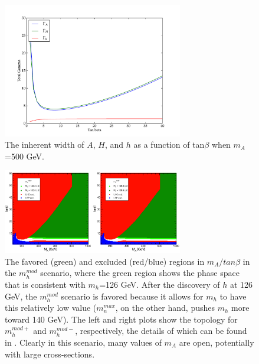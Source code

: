 \begin{figure}
	\centering
	\includegraphics[width=0.7\textwidth]{Theory/figures/TB_gamma.pdf}
	\caption{The inherent width of $A$, $H$, and $h$ as a function of tan$\beta$ when $m_A$=500 GeV. \label{fig:TB_width}}
\end{figure}





\begin{figure}
	\centering
	\includegraphics[width=0.7\textwidth]{Theory/figures/mh_mod.pdf}
	\caption{The favored (green) and excluded (red/blue) regions in 
    $m_A/tan\beta$ in the $m_h^{mod}$ scenario, where the green 
    region shows the phase space that is consistent with $m_h$=126 GeV.  
    After the discovery of $h$ at 126 GeV, the $m_h^{mod}$ 
    scenario is favored because it allows for $m_h$ to have 
    this relatively low value ($m_n^{max}$, on the other 
    hand, pushes $m_h$ more toward 140 GeV).  The 
    left and right plots show the topology for $m_h^{mod+}$ 
    and $m_h^{mod-}$, respectively, the details of which 
    can be found in \cite{Carena-2}. Clearly in this 
    scenario, many values of $m_A$ are open, potentially with large cross-sections. \label{fig:mh_mod}}
\end{figure}






